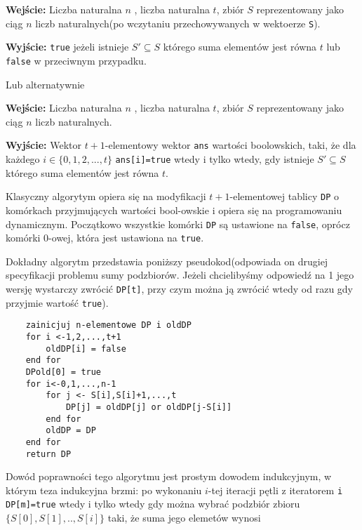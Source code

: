 \documentclass{article}
\begin{document}
\begin{tcolorbox}
    \textbf{Wejście:} Liczba naturalna $n$ , liczba naturalna $t$, zbiór $S$ reprezentowany jako ciąg $n$ liczb naturalnych(po wczytaniu 
    przechowywanych w wektoerze \texttt{S}).
    
    \textbf{Wyjście:} \texttt{true} jeżeli istnieje $S' \subseteq S$ którego suma elementów jest równa $t$ lub \texttt{false} w przeciwnym przypadku.
\end{tcolorbox}
Lub alternatywnie
\begin{tcolorbox}
    \textbf{Wejście:} Liczba naturalna $n$ , liczba naturalna $t$, zbiór $S$ reprezentowany jako ciąg $n$ liczb naturalnych.
    
    \textbf{Wyjście:} Wektor $t+1$-elementowy wektor \texttt{ans} wartości boolowskich, taki, że dla każdego
    $i \in \{0,1,2,...,t\}$ \texttt{ans[i]=true} wtedy i tylko wtedy, gdy
    istnieje $S' \subseteq S$ którego suma elementów jest równa $t$.
\end{tcolorbox}


Klasyczny algorytym opiera się na modyfikacji $t+1$-elementowej tablicy \texttt{DP} o komórkach przyjmujących wartości bool-owskie i 
opiera się na programowaniu dynamicznym. Początkowo wszystkie komórki \texttt{DP} są ustawione na \texttt{false}, oprócz komórki 
$0$-owej, która
jest ustawiona na \texttt{true}.

Dokładny algorytm przedstawia poniższy pseudokod(odpowiada on drugiej specyfikacji problemu sumy podzbiorów. Jeżeli chcielibyśmy
odpowiedź na 1 jego wersję wystarczy zwrócić \texttt{DP[t]}, przy czym można ją zwrócić wtedy od razu gdy przyjmie wartość \texttt{true}).
\begin{lstlisting}
    zainicjuj n-elementowe DP i oldDP
    for i <-1,2,...,t+1
        oldDP[i] = false
    end for 
    DPold[0] = true
    for i<-0,1,...,n-1
        for j <- S[i],S[i]+1,...,t
            DP[j] = oldDP[j] or oldDP[j-S[i]]
        end for
        oldDP = DP
    end for
    return DP
\end{lstlisting}

Dowód poprawności tego algorytmu jest prostym dowodem indukcyjnym, w którym teza indukcyjna
brzmi: po wykonaniu $i$-tej iteracji pętli z iteratorem \texttt{i}
 \texttt{DP[m]=true}
wtedy i tylko wtedy
gdy można wybrać podzbiór zbioru
$\{S\left[0\right],S\left[1\right],..,S\left[i\right]\}$
taki, że suma jego elemetów wynosi 
\end{document}
